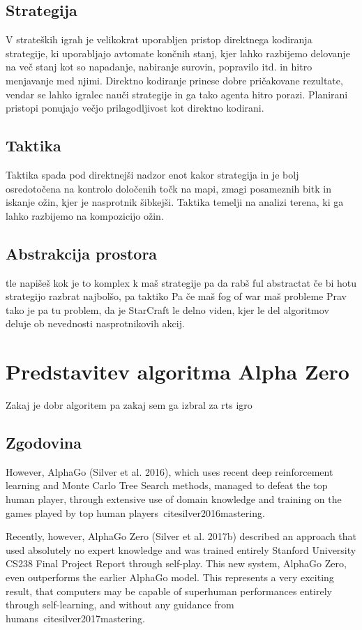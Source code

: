 \documentclass[a4paper, 12pt]{book}
\begin{document}
\section{Strategija}
V strateških igrah je velikokrat uporabljen pristop direktnega kodiranja strategije, ki uporabljajo avtomate končnih stanj, kjer lahko razbijemo delovanje na več stanj kot so napadanje, nabiranje surovin, popravilo itd. in hitro menjavanje med njimi. Direktno kodiranje prinese dobre pričakovane rezultate, vendar se lahko igralec nauči strategije in ga tako agenta hitro porazi.
Planirani pristopi ponujajo večjo prilagodljivost kot direktno kodirani.
\section{Taktika}
Taktika spada pod direktnejši nadzor enot kakor strategija in je bolj osredotočena na kontrolo določenih točk na mapi, zmagi posameznih bitk in iskanje ožin, kjer je nasprotnik šibkejši. Taktika temelji na analizi terena, ki ga lahko razbijemo na kompozicijo ožin.

\section{Abstrakcija prostora}
tle napišeš kok je to komplex k maš strategije pa da rabš ful abstractat če bi hotu strategijo razbrat najbolšo, pa taktiko
Pa če maš fog of war maš probleme
Prav tako je pa tu problem, da je StarCraft le delno viden, kjer le del algoritmov deluje ob nevednosti nasprotnikovih akcij.



\chapter{Predstavitev algoritma Alpha Zero}
\label{alphazero}
Zakaj je dobr algoritem pa zakaj sem ga izbral za rts igro
\section{Zgodovina}
However, AlphaGo (Silver et al. 2016), which uses recent deep reinforcement learning and Monte Carlo Tree Search methods, managed to defeat the top human player, through extensive use of domain knowledge and training on the games played by top human players~cite{silver2016mastering}.

Recently, however, AlphaGo Zero (Silver et al. 2017b) described an approach that used absolutely no expert knowledge and was trained entirely Stanford University CS238 Final Project Report through self-play. This new system, AlphaGo Zero, even outperforms the earlier AlphaGo model. This represents a very exciting result, that computers may be capable of superhuman performances entirely through self-learning, and without any guidance from humans~cite{silver2017mastering}.
\end{document}

